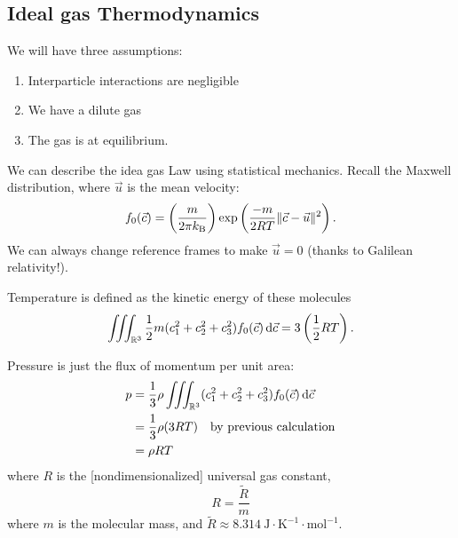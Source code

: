 \subsection{Ideal gas Thermodynamics}

\begin{assume}\label{assume:fall:lecture17:start-of-ideal-gases}
We will have three assumptions:
\begin{enumerate}
\item Interparticle interactions are negligible
\item We have a dilute gas
\item The gas is at equilibrium.
\end{enumerate}
\end{assume}

\begin{node}
We can describe the idea gas Law using statistical mechanics. Recall
the Maxwell distribution, where $\vec{u}$ is the mean velocity:
\begin{equation}
f_{0}(\vec{c})=\left(\frac{m}{2\pi k_{\textup{B}}}\right)\exp\left(\frac{-m}{2RT}\|\vec{c}-\vec{u}\|^{2}\right).
\end{equation}
We can always change reference frames to make $\vec{u}=0$ (thanks to
Galilean relativity!).
\end{node}

\begin{node}
Temperature is defined as the kinetic energy of these molecules
\begin{equation*}
\iiint_{\mathbb{R}^{3}}\frac{1}{2}m(c_{1}^{2}+c_{2}^{2}+c_{3}^{2})f_{0}(\vec{c})\,\mathrm{d}\vec{c}=3\left(\frac{1}{2}RT\right).
\end{equation*}
\end{node}

\begin{node}
Pressure is just the flux of momentum per unit area:
\begin{subequations}
  \begin{align}
p &=\frac{1}{3}\rho\iiint_{\mathbb{R}^{3}}(c_{1}^{2}+c_{2}^{2}+c_{3}^{2})f_{0}(\vec{c})\,\mathrm{d}\vec{c}\\
&=\frac{1}{3}\rho(3RT)\quad\mbox{by previous calculation}\\
&=\rho RT
  \end{align}
\end{subequations}
where $R$ is the [nondimensionalized] universal gas constant,
\begin{equation}
R = \frac{\widetilde{R}}{m}
\end{equation}
where $m$ is the molecular mass, and $\widetilde{R}\approx8.314~\mathrm{J}\cdot\mathrm{K}^{-1}\cdot\mathrm{mol}^{-1}$.
\end{node}

